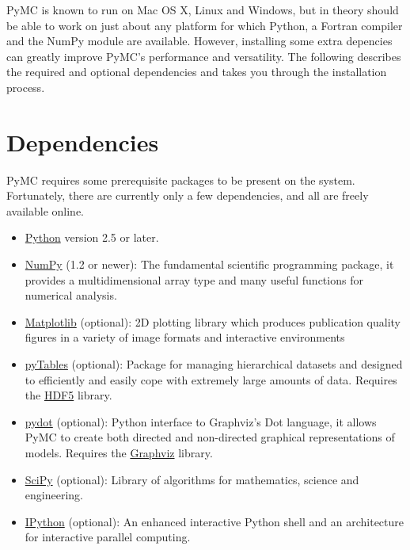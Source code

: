 


PyMC is known to run on Mac OS X, Linux and Windows, but in theory should be
able to work on just about any platform for which Python, a Fortran compiler
and the NumPy module are  available. However, installing some extra
depencies can greatly improve PyMC's performance and versatility.
The following describes the required and optional dependencies and takes you
through the installation process.



\hypertarget{dependencies}{}
\section*{Dependencies}
\label{dependencies}

PyMC requires some prerequisite packages to be present on the system.
Fortunately, there are currently only a few dependencies, and all are
freely available online.
\begin{itemize}
\item {} 
\href{http://www.python.org/.}{Python} version 2.5 or later.

\item {} 
\href{http://www.scipy.org/NumPy}{NumPy} (1.2 or newer): The fundamental scientific programming package, it provides a
multidimensional array type and many useful functions for numerical analysis.

\item {} 
\href{http://matplotlib.sourceforge.net/}{Matplotlib} (optional): 2D plotting library which produces publication
quality figures in a variety of image formats and interactive environments

\item {} 
\href{http://www.pytables.org/moin}{pyTables} (optional): Package for managing hierarchical datasets and
designed to efficiently and easily cope with extremely large amounts of data.
Requires the \href{http://www.hdfgroup.org/HDF5/}{HDF5} library.

\item {} 
\href{http://code.google.com/p/pydot/}{pydot} (optional): Python interface to Graphviz's Dot language, it allows
PyMC to create both directed and non-directed graphical representations of models.
Requires the \href{http://www.graphviz.org/}{Graphviz} library.

\item {} 
\href{http://www.scipy.org/}{SciPy} (optional): Library of algorithms for mathematics, science
and engineering.

\item {} 
\href{http://ipython.scipy.org/}{IPython} (optional): An enhanced interactive Python shell and an
architecture for interactive parallel computing.

\end{itemize}

